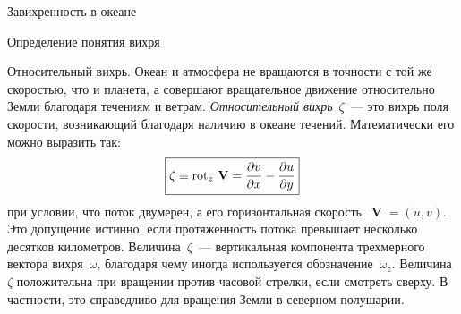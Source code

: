 \begin{chapter}{Завихренность в океане}
\begin{section}{Определение понятия вихря}
\begin{paragraph}{Относительный вихрь.}
Океан и атмосфера не вращаются в точности с той же скоростью, что 
и планета, а совершают вращательное движение
относительно Земли благодаря течениям и ветрам. 
\emph{Относительный вихрь}~$\zeta$~--- это 
вихрь поля скорости, возникающий благодаря наличию в океане течений.
Математически его можно выразить так:
\begin{equation}
\boxed{ \zeta \equiv \mathop{\mathrm{rot}}\nolimits_z\, \mathbf{V} 
 = \frac{\partial{v}}{\partial{x}}-\frac{\partial{u}}{\partial{y}} }
\end{equation}
при условии, что поток двумерен, а его горизонтальная
скорость~$\mbfV = (u, v)$. Это допущение истинно, если протяженность потока 
превышает несколько десятков километров. 
Величина~$\zeta $~--- вертикальная компонента трехмерного вектора
вихря~$\omega$, благодаря чему иногда используется обозначение~$\omega{_z}$.
Величина~$\zeta$ положительна при вращении против часовой стрелки, если
смотреть сверху. В частности, это справедливо для вращения Земли в северном
полушарии.
%


\end{paragraph}
\end{section}
\end{chapter}
